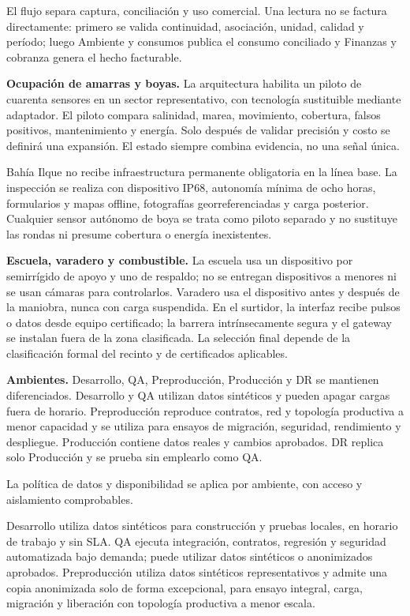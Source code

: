 El flujo separa captura, conciliación y uso comercial. Una lectura no se factura directamente: primero se valida continuidad, asociación, unidad, calidad y período; luego Ambiente y consumos publica el consumo conciliado y Finanzas y cobranza genera el hecho facturable.

\textbf{Ocupación de amarras y boyas.} La arquitectura habilita un piloto de cuarenta sensores en un sector representativo, con tecnología sustituible mediante adaptador. El piloto compara salinidad, marea, movimiento, cobertura, falsos positivos, mantenimiento y energía. Solo después de validar precisión y costo se definirá una expansión. El estado siempre combina evidencia, no una señal única.

Bahía Ilque no recibe infraestructura permanente obligatoria en la línea base. La inspección se realiza con dispositivo IP68, autonomía mínima de ocho horas, formularios y mapas offline, fotografías georreferenciadas y carga posterior. Cualquier sensor autónomo de boya se trata como piloto separado y no sustituye las rondas ni presume cobertura o energía inexistentes.

\textbf{Escuela, varadero y combustible.} La escuela usa un dispositivo por semirrígido de apoyo y uno de respaldo; no se entregan dispositivos a menores ni se usan cámaras para controlarlos. Varadero usa el dispositivo antes y después de la maniobra, nunca con carga suspendida. En el surtidor, la interfaz recibe pulsos o datos desde equipo certificado; la barrera intrínsecamente segura y el gateway se instalan fuera de la zona clasificada. La selección final depende de la clasificación formal del recinto y de certificados aplicables.

\textbf{Ambientes.} Desarrollo, QA, Preproducción, Producción y DR se mantienen diferenciados. Desarrollo y QA utilizan datos sintéticos y pueden apagar cargas fuera de horario. Preproducción reproduce contratos, red y topología productiva a menor capacidad y se utiliza para ensayos de migración, seguridad, rendimiento y despliegue. Producción contiene datos reales y cambios aprobados. DR replica solo Producción y se prueba sin emplearlo como QA.

La política de datos y disponibilidad se aplica por ambiente, con acceso y aislamiento comprobables.

Desarrollo utiliza datos sintéticos para construcción y pruebas locales, en horario de trabajo y sin SLA. QA ejecuta integración, contratos, regresión y seguridad automatizada bajo demanda; puede utilizar datos sintéticos o anonimizados aprobados. Preproducción utiliza datos sintéticos representativos y admite una copia anonimizada solo de forma excepcional, para ensayo integral, carga, migración y liberación con topología productiva a menor escala.

